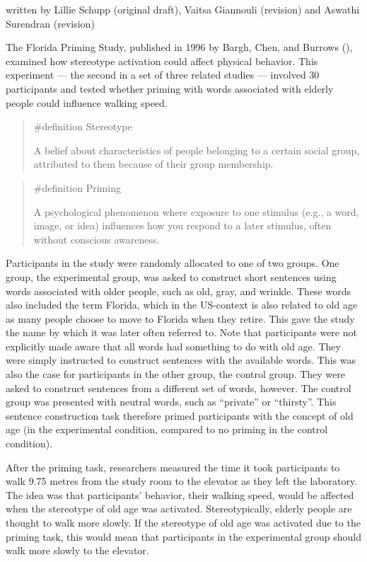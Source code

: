 \documentclass[
  letterpaper,
]{book}
\begin{document}
{written by Lillie Schupp (original draft), Vaitsa Giannouli (revision)
and Aswathi Surendran (revision)}

The Florida Priming Study, published in 1996 by Bargh, Chen, and Burrows
(), examined
how stereotype activation could affect physical behavior. This
experiment --- the second in a set of three related studies --- involved
30 participants and tested whether priming with words associated with
elderly people could influence walking speed.

\begin{quote}
\label{def-stereotype}{\#definition} Stereotype

A belief about characteristics of people belonging to a certain social
group, attributed to them because of their group membership.
\end{quote}

\begin{quote}
\label{def-priming}{\#definition} Priming

A psychological phenomenon where exposure to one stimulus (e.g., a word,
image, or idea) influences how you respond to a later stimulus, often
without conscious awareness.
\end{quote}

Participants in the study were randomly allocated to one of two groups.
One group, the experimental group, was asked to construct short
sentences using words associated with older people, such as old, gray,
and wrinkle. These words also included the term Florida, which in the
US-context is also related to old age as many people choose to move to
Florida when they retire. This gave the study the name by which it was
later often referred to. Note that participants were not explicitly made
aware that all words had something to do with old age. They were simply
instructed to construct sentences with the available words. This was
also the case for participants in the other group, the control group.
They were asked to construct sentences from a different set of words,
however. The control group was presented with neutral words, such as
``private'' or ``thirsty''. This sentence construction task therefore
primed participants with the concept of old age (in the experimental
condition, compared to no priming in the control condition).

After the priming task, researchers measured the time it took
participants to walk 9.75 metres from the study room to the elevator as
they left the laboratory. The idea was that participants' behavior,
their walking speed, would be affected when the stereotype of old age
was activated. Stereotypically, elderly people are thought to walk more
slowly. If the stereotype of old age was activated due to the priming
task, this would mean that participants in the experimental group should
walk more slowly to the elevator.
\end{document}

